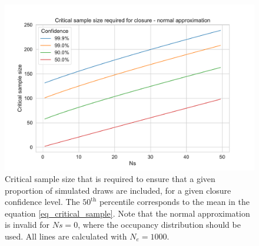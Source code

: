 \documentclass[review,nonatbib]{elsarticle}
\begin{document}


\begin{figure}[H]
  \centering
  \includegraphics[width=\textwidth]{fig/critical_normal.pdf}
  \caption{Critical sample size that is required to ensure that a given proportion of simulated
  draws are included, for a given closure confidence level. The
    $50^\text{th}$ percentile corresponds to the mean in the equation \eqref{eq_critical_sample}. Note that the
    normal approximation is invalid for $Ns=0$, where the occupancy distribution should be used. All
    lines are calculated with $N_e=1000$.}
  \label{fig_apx_critical_normal}
\end{figure}
\end{document}
